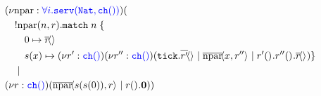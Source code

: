 %
\begin{align*}
    &(\nu \text{npar} : {\color{blue} \forall i.\texttt{serv}(\texttt{Nat},\texttt{ch}())})(\\
    &\kern1em !\text{npar}(n,r).\texttt{match}\; n\; \{\\
    &\kern2em 0 \mapsto \overline{r}\!\langle \rangle^{}\\
    &\kern2em s(x) \mapsto (\nu r' : {\color{blue} \texttt{ch}()})(\nu r'' : {\color{blue} \texttt{ch}()})(\texttt{tick}.\overline{r'}\!\langle \rangle^{} \mid
 \overline{\text{npar}}\!\langle x,r''\rangle^{} \mid r'()^{}.r''()^{}.\overline{r}\!\langle \rangle^{}) \} \\
    &\kern1em \mid \\
    &(\nu r : {\color{blue} \texttt{ch}()})( \overline{\text{npar}}\!\langle s(s(0)),r\rangle^{} \mid r()^{}.\mathbf{0} ))
\end{align*}

